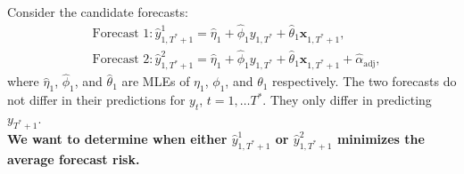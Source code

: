\documentclass[11pt]{article}
\newcommand{\x}{\textbf{x}}
\begin{document}
Consider the candidate forecasts: 
\begin{align*}
  &\text{Forecast 1}: \hat y_{1,T^*+1}^1 = \hat\eta_1 
    + \hat\phi_1 y_{1,T^*} + \hat\theta_1 \x_{1,T^*+1}, \\
  &\text{Forecast 2}: \hat y_{1,T^*+1}^2 = \hat\eta_1 
    + \hat\phi_1 y_{1,T^*} + \hat\theta_1 \x_{1,T^*+1} + \hat{\alpha}_{\text{adj}},
\end{align*}
where $\hat\eta_1$, $\hat\phi_1$, and $\hat\theta_1$ are MLEs of 
$\eta_1$, $\phi_1$, and $\theta_1$ respectively.  
The two forecasts do not differ in their predictions for 
$y_{t}$, $t = 1,\ldots T^*$.  They only differ in predicting $y_{T^*+1}$.  \\


{\bf We want to determine when either $\hat y_{1,T^*+1}^1$ or 
$\hat y_{1,T^*+1}^2$ minimizes the average forecast risk.}
\end{document}
